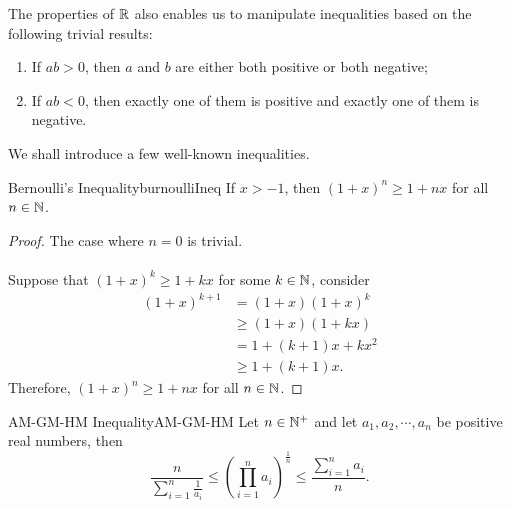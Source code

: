 \documentclass[math]{amznotes}
\theoremstyle{remark}
\begin{document}
The properties of $\mathbb{R}$ also enables us to manipulate inequalities based on the following trivial results:
\begin{enumerate}
    \item If $ab > 0$, then $a$ and $b$ are either both positive or both negative;
    \item If $ab < 0$, then exactly one of them is positive and exactly one of them is negative.
\end{enumerate}
We shall introduce a few well-known inequalities.
\begin{thmbox}{Bernoulli's Inequality}{burnoulliIneq}
    If $x > -1$, then $(1 + x)^n \geq 1 + nx$ for all $n \in \mathbb{N}$.
    \tcblower
    \begin{proof}
        The case where $n = 0$ is trivial.
        \\\\
        Suppose that $(1 + x)^k \geq 1 + kx$ for some $k \in \mathbb{N}$, consider
        \begin{align*}
            (1 + x)^{k + 1} & = (1 + x)(1 + x)^k \\
            & \geq (1 + x)(1 + kx) \\
            & = 1 + (k + 1)x + kx^2 \\
            & \geq 1 + (k + 1)x.
        \end{align*}
        Therefore, $(1 + x)^n \geq 1 + nx$ for all $n \in \mathbb{N}$.
    \end{proof}
\end{thmbox}
\begin{thmbox}{AM-GM-HM Inequality}{AM-GM-HM}
    Let $n \in \mathbb{N}^+$ and let $a_1, a_2, \cdots, a_n$ be positive real numbers, then
    \begin{equation*}
        \frac{n}{\sum_{i = 1}^{n}\frac{1}{a_i}} \leq \left(\prod_{i = 1}^{n}a_i\right)^{\frac{1}{n}} \leq \frac{\sum_{i = 1}^{n}a_i}{n}.
    \end{equation*}
\end{thmbox}
\end{document}

